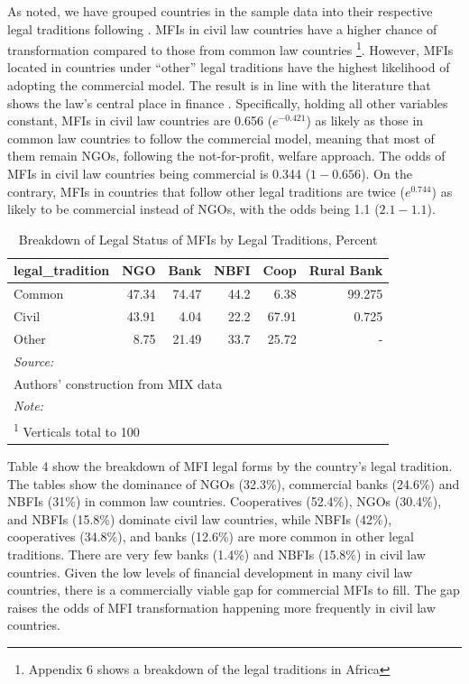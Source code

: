 \documentclass[a4paper, nobind]{templates/ociamthesis}
\begin{document}
As noted, we have grouped countries in the sample data into their respective legal traditions following \textcite{oto2014distribution}. MFIs in civil law countries have a higher chance of transformation compared to those from common law countries \footnote{Appendix 6 shows a breakdown of the legal traditions in Africa}. However, MFIs located in countries under ``other'' legal traditions have the highest likelihood of adopting the commercial model. The result is in line with the literature that shows the law's central place in finance \autocite{la2013law}. Specifically, holding all other variables constant, MFIs in civil law countries are 0.656 (\(e^{-0.421}\)) as likely as those in common law countries to follow the commercial model, meaning that most of them remain NGOs, following the not-for-profit, welfare approach. The odds of MFIs in civil law countries being commercial is 0.344 (\(1 - 0.656\)). On the contrary, MFIs in countries that follow other legal traditions are twice (\(e^{0.744}\)) as likely to be commercial instead of NGOs, with the odds being 1.1 (\(2.1 - 1.1\)).

\begin{table}

\caption{\label{tab:unnamed-chunk-37}Breakdown of Legal Status of MFIs by Legal Traditions, Percent}
\centering
\begin{tabular}[t]{lrrrrr}
\toprule
legal\_tradition & NGO & Bank & NBFI & Coop & Rural Bank\\
\midrule
Common & 47.34 & 74.47 & 44.2 & 6.38 & 99.275\\
Civil & 43.91 & 4.04 & 22.2 & 67.91 & 0.725\\
Other & 8.75 & 21.49 & 33.7 & 25.72 & -\\
\bottomrule
\multicolumn{6}{l}{\rule{0pt}{1em}\textit{Source: }}\\
\multicolumn{6}{l}{\rule{0pt}{1em}Authors' construction from MIX data}\\
\multicolumn{6}{l}{\rule{0pt}{1em}\textit{Note: }}\\
\multicolumn{6}{l}{\rule{0pt}{1em}\textsuperscript{1} Verticals total to 100}\\
\end{tabular}
\end{table}

Table 4 show the breakdown of MFI legal forms by the country's legal tradition. The tables show the dominance of NGOs (32.3\%), commercial banks (24.6\%) and NBFIs (31\%) in common law countries. Cooperatives (52.4\%), NGOs (30.4\%), and NBFIs (15.8\%) dominate civil law countries, while NBFIs (42\%), cooperatives (34.8\%), and banks (12.6\%) are more common in other legal traditions. There are very few banks (1.4\%) and NBFIs (15.8\%) in civil law countries. Given the low levels of financial development in many civil law countries, there is a commercially viable gap for commercial MFIs to fill. The gap raises the odds of MFI transformation happening more frequently in civil law countries.
\end{document}
